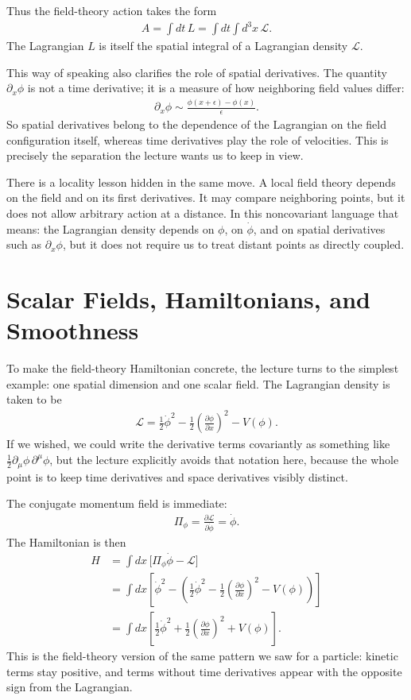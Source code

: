 Thus the field-theory action takes the form
\begin{align}
A=\int dt\,L=\int dt\int d^3x\,\mathcal L.
\end{align}
The Lagrangian \(L\) is itself the spatial integral of a Lagrangian density \(\mathcal L\).

This way of speaking also clarifies the role of spatial derivatives. The quantity \(\partial_x\phi\) is not a time derivative; it is a measure of how neighboring field values differ:
\begin{align}
\partial_x\phi \sim \frac{\phi(x+\epsilon)-\phi(x)}{\epsilon}.
\end{align}
So spatial derivatives belong to the dependence of the Lagrangian on the field configuration itself, whereas time derivatives play the role of velocities. This is precisely the separation the lecture wants us to keep in view.

There is a locality lesson hidden in the same move. A local field theory depends on the field and on its first derivatives. It may compare neighboring points, but it does not allow arbitrary action at a distance. In this noncovariant language that means: the Lagrangian density depends on \(\phi\), on \(\dot\phi\), and on spatial derivatives such as \(\partial_x\phi\), but it does not require us to treat distant points as directly coupled.

\section{Scalar Fields, Hamiltonians, and Smoothness}

To make the field-theory Hamiltonian concrete, the lecture turns to the simplest example: one spatial dimension and one scalar field. The Lagrangian density is taken to be
\begin{align}
\mathcal L=\frac12\dot\phi^2-\frac12\left(\frac{\partial\phi}{\partial x}\right)^2-V(\phi).
\end{align}
If we wished, we could write the derivative terms covariantly as something like \(\frac12\partial_\mu\phi\,\partial^\mu\phi\), but the lecture explicitly avoids that notation here, because the whole point is to keep time derivatives and space derivatives visibly distinct.

The conjugate momentum field is immediate:
\begin{align}
\Pi_\phi=\frac{\partial \mathcal L}{\partial \dot\phi}=\dot\phi.
\end{align}
The Hamiltonian is then
\begin{align}
H&=\int dx\,\bigl[\Pi_\phi\dot\phi-\mathcal L\bigr] \\
 &=\int dx\left[\dot\phi^2-\left(\frac12\dot\phi^2-\frac12\left(\frac{\partial\phi}{\partial x}\right)^2-V(\phi)\right)\right] \\
 &=\int dx\left[\frac12\dot\phi^2+\frac12\left(\frac{\partial\phi}{\partial x}\right)^2+V(\phi)\right].
\end{align}
This is the field-theory version of the same pattern we saw for a particle: kinetic terms stay positive, and terms without time derivatives appear with the opposite sign from the Lagrangian.


